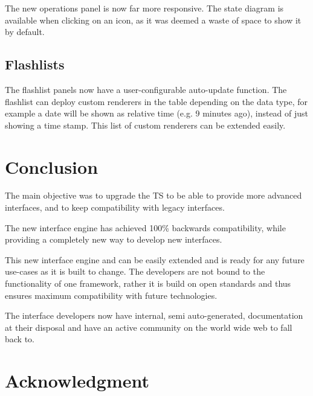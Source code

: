 \documentclass[journal]{IEEEtran}
\begin{document}
The new operations panel is now far more responsive.
The state diagram is available when clicking on an icon, as it was deemed a
waste of space to show it by default.

\subsection{Flashlists}

The flashlist panels now have a user-configurable auto-update function.
The flashlist can deploy custom renderers in the table depending on the data type,
for example a date will be shown as relative time (e.g. 9 minutes ago), instead
of just showing a time stamp. This list of custom renderers can be extended
easily.


\section{Conclusion}
The main objective was to upgrade the TS to be able to provide more advanced
interfaces, and to keep compatibility with legacy interfaces.

The new interface engine has achieved 100\% backwards compatibility, while
providing a completely new way to develop new interfaces.

This new interface engine and can be easily extended and is ready for any future
use-cases as it is built to change. The developers are not bound to the
functionality of one framework, rather it is build on open standards and thus
ensures maximum compatibility with future technologies.

The interface developers now have internal, semi auto-generated, documentation
at their disposal and have an active community on the world wide web to fall
back to.

\section*{Acknowledgment}

\end{document}
